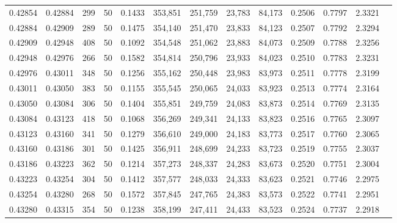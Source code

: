 \begin{tabular}{rrrrrrrrrrrrr}
0.42854 & 0.42884 &   299 &  50 &                                     0.1433 & 353,851 & 251,759 &  23,783 &  84,173 & 0.2506 & 0.7797 & 2.3321 \\
0.42884 & 0.42909 &   289 &  50 &                                     0.1475 & 354,140 & 251,470 &  23,833 &  84,123 & 0.2507 & 0.7792 & 2.3294 \\
0.42909 & 0.42948 &   408 &  50 &                                     0.1092 & 354,548 & 251,062 &  23,883 &  84,073 & 0.2509 & 0.7788 & 2.3256 \\
0.42948 & 0.42976 &   266 &  50 &                                     0.1582 & 354,814 & 250,796 &  23,933 &  84,023 & 0.2510 & 0.7783 & 2.3231 \\
0.42976 & 0.43011 &   348 &  50 &                                     0.1256 & 355,162 & 250,448 &  23,983 &  83,973 & 0.2511 & 0.7778 & 2.3199 \\
0.43011 & 0.43050 &   383 &  50 &                                     0.1155 & 355,545 & 250,065 &  24,033 &  83,923 & 0.2513 & 0.7774 & 2.3164 \\
0.43050 & 0.43084 &   306 &  50 &                                     0.1404 & 355,851 & 249,759 &  24,083 &  83,873 & 0.2514 & 0.7769 & 2.3135 \\
0.43084 & 0.43123 &   418 &  50 &                                     0.1068 & 356,269 & 249,341 &  24,133 &  83,823 & 0.2516 & 0.7765 & 2.3097 \\
0.43123 & 0.43160 &   341 &  50 &                                     0.1279 & 356,610 & 249,000 &  24,183 &  83,773 & 0.2517 & 0.7760 & 2.3065 \\
0.43160 & 0.43186 &   301 &  50 &                                     0.1425 & 356,911 & 248,699 &  24,233 &  83,723 & 0.2519 & 0.7755 & 2.3037 \\
0.43186 & 0.43223 &   362 &  50 &                                     0.1214 & 357,273 & 248,337 &  24,283 &  83,673 & 0.2520 & 0.7751 & 2.3004 \\
0.43223 & 0.43254 &   304 &  50 &                                     0.1412 & 357,577 & 248,033 &  24,333 &  83,623 & 0.2521 & 0.7746 & 2.2975 \\
0.43254 & 0.43280 &   268 &  50 &                                     0.1572 & 357,845 & 247,765 &  24,383 &  83,573 & 0.2522 & 0.7741 & 2.2951 \\
0.43280 & 0.43315 &   354 &  50 &                                     0.1238 & 358,199 & 247,411 &  24,433 &  83,523 & 0.2524 & 0.7737 & 2.2918 \\

\end{tabular}

